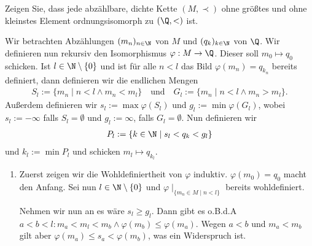 \begin{exercise}
    Zeigen Sie, dass jede abzählbare, dichte Kette $(M, \prec)$ ohne größtes und ohne kleinstes Element ordnungsisomorph zu $(\Q, <)$ ist.
\end{exercise}
\begin{solution}
    Wir betrachten Abzählungen $(m_n)_{n \in \N}$ von $M$ und $(q_k)_{k \in \N}$ von $\Q$. Wir definieren nun rekursiv den Isomorphismus $\varphi: M \to \Q$. Dieser soll $m_0 \mapsto q_0$ schicken. Ist $l \in \N \setminus \{0\}$ und ist für alle $n < l$ das Bild $\varphi(m_n) = q_{k_n}$ bereits definiert, dann definieren wir die endlichen Mengen
    \begin{align*}
        S_l := \{m_n \mid n < l \land m_n < m_l \} \quad \textrm{und} \quad G_l := \{m_n \mid n < l \land m_n > m_l \}.
    \end{align*}
    Außerdem definieren wir $s_l := \max \varphi(S_l)$ und $g_l := \min \varphi(G_l)$, wobei $s_l := -\infty$ falls $S_l = \emptyset$ und $g_l := \infty$, falls $G_l = \emptyset$. Nun definieren wir 
    \begin{align*}
        P_l := \{k \in \N \mid s_l < q_k < g_l \}
    \end{align*}
    und $k_l := \min P_l$ und schicken $m_l \mapsto q_{k_l}$. 
    \begin{enumerate}
        \item Zuerst zeigen wir die Wohldefiniertheit von $\varphi$ induktiv. $\varphi(m_0) = q_0$ macht den Anfang. Sei nun $l \in \N \setminus \{0\}$ und $\varphi \mid_{\{m_n \in M \mid n < l\}}$ bereits wohldefiniert. 
        
        Nehmen wir nun an es wäre $s_l \geq g_l$. Dann gibt es o.B.d.A $a < b < l: m_a < m_l < m_b \land \varphi(m_b) \leq \varphi(m_a)$. Wegen $a < b$ und $m_a < m_b$ gilt aber $\varphi(m_a) \leq s_a < \varphi(m_b)$, was ein Widerspruch ist. 
        

\end{enumerate}
\end{solution}
